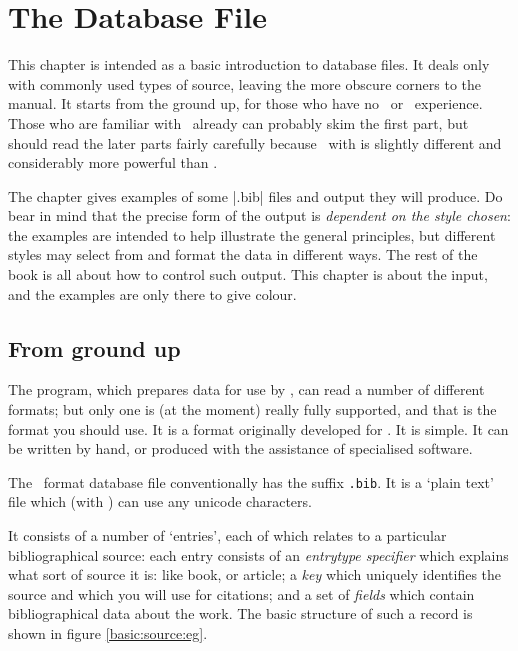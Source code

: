\chapter{The Database File}\label{ch:database}

This chapter is intended as a basic introduction to database files. It
deals only with commonly used types of source, leaving the more
obscure corners to the manual. It starts from the ground up, for those
who have no \bibtex\ or \biblatex\ experience. Those who are familiar
with \bibtex\ already can probably skim the first part, but should
read the later parts fairly carefully because \biblatex\, with
 is slightly different and considerably more powerful
than \bibtex.

The chapter gives examples of some |.bib| files and output they will
produce. Do bear in mind that the precise form of the output is
\emph{dependent on the style chosen}: the examples are intended to
help illustrate the general principles, but different styles may
select from and format the data in different ways. The rest of the
book is all about how to control such output. This chapter is about
the input, and the examples are only there to give colour.

\section{From ground up}
%
The  program, which prepares data for use by \biblatex,
can read a number of different formats; but only one is (at the
moment) really fully supported, and that is the format you should
use. It is a format originally developed for \bibtex. It is simple. It
can be written by hand, or produced with the assistance of specialised
software.

The \bibtex\ format database file conventionally has the suffix
\verb|.bib|. It is a `plain text' file which (with )
can use any unicode characters.

It consists of a number of `entries', each of which relates to a
particular bibliographical source: each entry consists of an
\emph{entrytype specifier} which explains what sort of source it is:
like book, or article; a \emph{key} which uniquely identifies the
source and which you will use for citations; and a set of
\emph{fields} which contain bibliographical data about the work. The
basic structure of such a record is shown in figure
\ref{basic:source:eg}.

